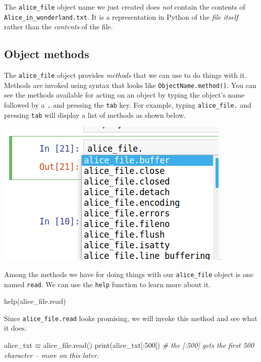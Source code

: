 \documentclass[
]{book}
\newenvironment{Shaded}{\begin{snugshade}}{\end{snugshade}}
\newcommand{\BuiltInTok}[1]{#1}
\newcommand{\CommentTok}[1]{\textcolor[rgb]{0.56,0.35,0.01}{\textit{#1}}}
\newcommand{\DecValTok}[1]{\textcolor[rgb]{0.00,0.00,0.81}{#1}}
\newcommand{\NormalTok}[1]{#1}
\newcommand{\OperatorTok}[1]{\textcolor[rgb]{0.81,0.36,0.00}{\textbf{#1}}}
\begin{document}
The \texttt{alice\_file} object name we just created does \emph{not} contain the contents of \texttt{Alice\_in\_wonderland.txt}. It is a representation in Python of the \emph{file itself} rather than the \emph{contents} of the file.

\hypertarget{object-methods}{%
\subsection{Object methods}\label{object-methods}}

The \texttt{alice\_file} object provides \emph{methods} that we can use to do things with it. Methods are invoked using syntax that looks like \texttt{ObjectName.method()}. You can see the methods available for acting on an object by typing the object's name followed by a \texttt{.} and pressing the \texttt{tab} key. For example, typing \texttt{alice\_file.} and pressing \texttt{tab} will display a list of methods as shown below.

\includegraphics{Python/PythonIntro/images/notebook_file_completion.png}.

Among the methods we have for doing things with our \texttt{alice\_file} object is one named \texttt{read}. We can use the \texttt{help} function to learn more about it.

\begin{Shaded}
\begin{Highlighting}[]
\BuiltInTok{help}\NormalTok{(alice_file.read)}
\end{Highlighting}
\end{Shaded}

Since \texttt{alice\_file.read} looks promising, we will invoke this method and see what it does.

\begin{Shaded}
\begin{Highlighting}[]
\NormalTok{alice_txt }\OperatorTok{=}\NormalTok{ alice_file.read()}
\BuiltInTok{print}\NormalTok{(alice_txt[:}\DecValTok{500}\NormalTok{]) }\CommentTok{# the [:500] gets the first 500 character -- more on this later.}
\end{Highlighting}
\end{Shaded}
\end{document}
